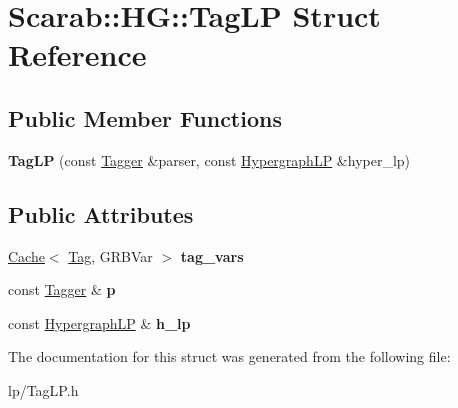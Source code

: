 \hypertarget{structScarab_1_1HG_1_1TagLP}{
\section{Scarab::HG::TagLP Struct Reference}
\label{structScarab_1_1HG_1_1TagLP}
}
\subsection*{Public Member Functions}
\begin{DoxyCompactItemize}
\item 
\hypertarget{structScarab_1_1HG_1_1TagLP_a529942132dc8900bd25d2acaef721694}{
{\bfseries TagLP} (const \hyperlink{classTagger}{Tagger} \&parser, const \hyperlink{structScarab_1_1HG_1_1HypergraphLP}{HypergraphLP} \&hyper\_\-lp)}
\label{structScarab_1_1HG_1_1TagLP_a529942132dc8900bd25d2acaef721694}

\end{DoxyCompactItemize}
\subsection*{Public Attributes}
\begin{DoxyCompactItemize}
\item 
\hypertarget{structScarab_1_1HG_1_1TagLP_a4e80b783a5dfce94abb94cb957a3fe50}{
\hyperlink{classCache}{Cache}$<$ \hyperlink{structTag}{Tag}, GRBVar $>$ {\bfseries tag\_\-vars}}
\label{structScarab_1_1HG_1_1TagLP_a4e80b783a5dfce94abb94cb957a3fe50}

\item 
\hypertarget{structScarab_1_1HG_1_1TagLP_a137ec6055ea83b552c873dd19f203c15}{
const \hyperlink{classTagger}{Tagger} \& {\bfseries p}}
\label{structScarab_1_1HG_1_1TagLP_a137ec6055ea83b552c873dd19f203c15}

\item 
\hypertarget{structScarab_1_1HG_1_1TagLP_a92b885535389aa44e450e8f4682bf543}{
const \hyperlink{structScarab_1_1HG_1_1HypergraphLP}{HypergraphLP} \& {\bfseries h\_\-lp}}
\label{structScarab_1_1HG_1_1TagLP_a92b885535389aa44e450e8f4682bf543}

\end{DoxyCompactItemize}


The documentation for this struct was generated from the following file:\begin{DoxyCompactItemize}
\item 
lp/TagLP.h\end{DoxyCompactItemize}
